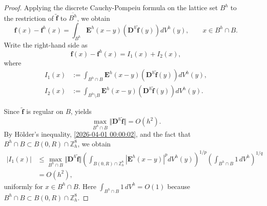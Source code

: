 \documentclass{amsart}
\theoremstyle{definition}
\theoremstyle{remark}
\numberwithin{equation}{section}
\newcommand{\Z}{\mathbb Z}
\newcommand{\f}{\bm{f}}
\newcommand{\E}{\bm{E}}
\begin{document}
\begin{proof}
    Applying the discrete Cauchy-Pompeiu formula  on the lattice set $B^h$ to the restriction of $\bm {\tilde f}$ to $\overline{B^h}$, we obtain
    \begin{equation*}
        \f(x)-\f^h(x)=\int_{B^h} \E^h(x-y)\left(\bm D^h\bm{\tilde f}(y)\right) dV^h(y),
        \qquad x\in B^h\cap B.
    \end{equation*}
    Write the right-hand side as
    \begin{equation*}
        \f(x)-\f^h(x)=I_1(x)+I_2(x),
    \end{equation*}
    where
    \begin{equation*}
        \begin{aligned}
            I_1(x)&:=\int_{B^h\cap B} \E^h(x-y)\left(\bm D^h\bm{\tilde f}(y)\right) dV^h(y),\\
            I_2(x)&:=\int_{B^h\setminus B} \E^h(x-y)\left(\bm D^h\bm{\tilde f}(y)\right) dV^h(y).
        \end{aligned}
    \end{equation*}

    Since $\bm {\tilde f}$ is regular on $B$,  yields
    \begin{equation}
        \label{2026-04-01 00:00:03}
        \max_{B^h\cap B}\Vert \bm D^h \bm{\tilde f} \Vert =O(h^2).
    \end{equation}
    By Hölder's inequality, \eqref{2026-04-01 00:00:02}, and the fact that
    $B^h\cap B\subset B(0,R)\cap \Z_h^8$, we obtain
    \begin{equation*}
        \begin{aligned}
            |I_1(x)|
            &\le \max_{B^h\cap B}\Vert \bm D^h \bm{\tilde f}\Vert
            \left(\int_{B(0,R)\cap \Z_h^8} |\E^h(x-y)|^p dV^h(y)\right)^{1/p}
            \left(\int_{B^h\cap B} 1\,dV^h\right)^{1/q}\\
            &=O(h^2),
        \end{aligned}
    \end{equation*}
    uniformly for $x\in B^h\cap B$.
    Here $\int_{B^h\cap B}1\,dV^h=O(1)$ because $B^h\cap B\subset B(0,R)\cap \Z_h^8$.


\end{proof}
\end{document}
